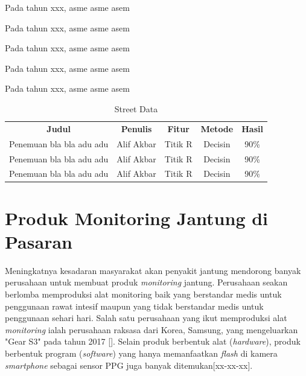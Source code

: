 Pada tahun xxx, asme asme asem

Pada tahun xxx, asme asme asem

Pada tahun xxx, asme asme asem

Pada tahun xxx, asme asme asem

Pada tahun xxx, asme asme asem

\begin{table}[H]
\centering
	\begin{tabular}{|c|c|c|c|c|}
	\hline
	\rowcolor{gray}
	\textbf{Judul} & \textbf{Penulis} & \textbf{Fitur} & \textbf{Metode}  & \textbf{Hasil}\\
	\cline{1-5}
	Penemuan bla bla adu adu & Alif Akbar & Titik R & Decisin & 90\% \\
	\cline{1-5}
	Penemuan bla bla adu adu & Alif Akbar & Titik R & Decisin & 90\% \\
	\cline{1-5}
	Penemuan bla bla adu adu & Alif Akbar & Titik R & Decisin & 90\% \\
	\hline
	\end{tabular}
	\caption{Street Data}
	\label{table:tbljalan}
\end{table}

\section{Produk Monitoring Jantung di Pasaran}
Meningkatnya kesadaran masyarakat akan penyakit jantung mendorong banyak perusahaan untuk membuat produk \textit{monitoring} jantung. Perusahaan seakan berlomba memproduksi alat monitoring baik yang berstandar medis untuk penggunaan rawat intesif maupun yang tidak berstandar medis untuk penggunaan sehari hari. Salah satu perusahaan yang ikut memproduksi alat \textit{monitoring} ialah perusahaan raksasa dari Korea, Samsung, yang mengeluarkan "Gear S3" pada tahun 2017 []. Selain produk berbentuk alat (\textit{hardware}), produk berbentuk program (\textit{software}) yang hanya memanfaatkan \textit{flash} di kamera \textit{smartphone} sebagai sensor PPG juga banyak ditemukan[xx-xx-xx].

